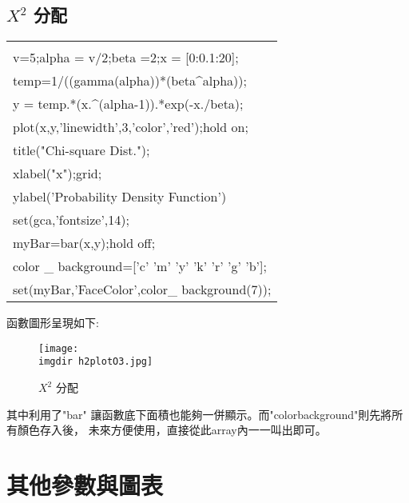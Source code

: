 		\subsection{$X^2$ 分配}%
		\begin{center}\colorbox{slight}{
				\begin{tabular}{p{}}
					\MJHmarker{\textbf{MATLAB語法 :}}\\					
					v=5;alpha = v/2;beta =2;x = [0:0.1:20];\\
					temp=1/((gamma(alpha))*(beta$\^$alpha));\\
					y = temp.*(x.$\^$(alpha-1)).*exp(-x./beta);\\
					plot(x,y,'linewidth',3,'color','red');hold on;\\
					title("Chi-square Dist.");\\
					xlabel("x");grid;\\
					ylabel('Probability Density Function')\\
					set(gca,'fontsize',14);\\					
					myBar=bar(x,y);hold off;\\
					color \_ background=['c' 'm' 'y' 'k' 'r' 'g' 'b'];\\
					set(myBar,'FaceColor',color\_ background(7));\\
				\end{tabular}
			}
			\end{center}	
				
		函數圖形呈現如下:
		\begin{figure}[H]	
		 	 \centering	 			 	 
   			 \texttt{[image: \\imgdir h2plotO3.jpg]} 
   			 \caption{$X^2$ 分配} 	
   			 \label{h2plotO3}   			 		 
		\end{figure}		
		其中利用了"bar" 讓函數底下面積也能夠一併顯示。而"colorbackground"則先將所有顏色存入後，			未來方便使用，直接從此array內一一叫出即可。
	\section{其他參數與圖表}
